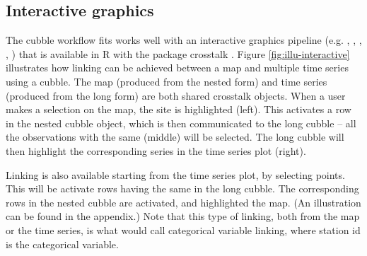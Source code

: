 \documentclass[
]{jss}
\begin{document}
\hypertarget{interactive-graphics}{%
\subsection{Interactive graphics}\label{interactive-graphics}}

The cubble workflow fits works well with an interactive graphics pipeline (e.g. \citet{buja1988elements}, \citet{buja1996interactive}, \citet{sutherland2000orca}, \citet{xie2014reactive}, \citet{cheng2016enabling}) that is available in R with the package crosstalk \citep{crosstalk}. Figure \ref{fig:illu-interactive} illustrates how linking can be achieved between a map and multiple time series using a cubble. The map (produced from the nested form) and time series (produced from the long form) are both shared crosstalk objects. When a user makes a selection on the map, the site is highlighted (left). This activates a row in the nested cubble object, which is then communicated to the long cubble -- all the observations with the same  (middle) will be selected. The long cubble will then highlight the corresponding series in the time series plot (right).

Linking is also available starting from the time series plot, by selecting points. This will be activate rows having the same  in the long cubble. The corresponding rows in the nested cubble are activated, and highlighted the map. (An illustration can be found in the appendix.) Note that this type of linking, both from the map or the time series, is what \citet{CS07} would call categorical variable linking, where station id is the categorical variable.
\end{document}
